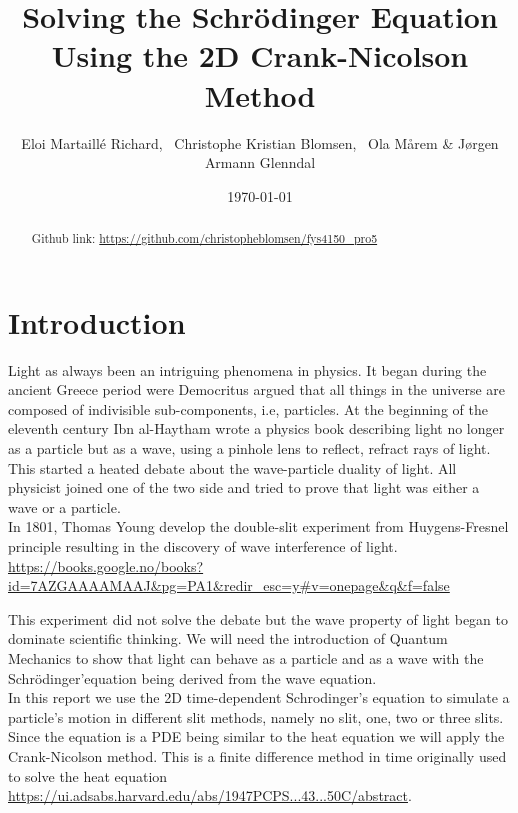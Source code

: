 \documentclass[english,notitlepage,reprint,nofootinbib]{revtex4-2}  %
\begin{document}
	
	\title{Solving the Schrödinger Equation Using the 2D Crank-Nicolson Method}  %
	\author{Eloi Martaillé Richard,
	\
	Christophe Kristian Blomsen,
	\
	Ola Mårem
	\&
	Jørgen Armann Glenndal
    }
	\date{\today}                             %
	\noaffiliation                            %
	
	\begin{abstract}
Github link: \href{https://github.com/christopheblomsen/fys4150_pro5}{https://github.com/christopheblomsen/fys4150\_pro5}
\end{abstract}
	\maketitle	
	
	
	\section{Introduction} \label{sec:introduction}

	Light as always been an intriguing phenomena in physics. It began during the ancient Greece
	period were Democritus argued that all things in the universe are composed of indivisible 
	sub-components, i.e, particles. At the beginning of the eleventh century Ibn al-Haytham 
	wrote a physics book describing light no longer as a particle but as a wave, using a 
	pinhole lens to reflect, refract rays of light. This started a heated debate about the 
	wave-particle duality of light. All physicist joined one of the two side and tried to 
	prove that light was either a wave or a particle. \\
	
	In 1801, Thomas Young develop the double-slit experiment from Huygens-Fresnel principle
	resulting in the discovery of wave interference of light. \url{https://books.google.no/books?id=7AZGAAAAMAAJ&pg=PA1&redir_esc=y#v=onepage&q&f=false}
	
	This experiment did not solve the debate but the wave property of light began to dominate 
	scientific thinking. We will need the introduction of Quantum Mechanics to show that 
	light can behave as a particle and as a wave with the Schrödinger'equation being derived 
	from the wave equation. \\
	
	In this report we use the 2D time-dependent Schrodinger's equation to simulate a particle's
	motion in different slit methods, namely no slit, one, two or three slits. Since the 
	equation is a PDE being similar to the heat equation we will apply the Crank-Nicolson method.
	This is a finite difference method in time originally used to solve the heat equation
	\url{https://ui.adsabs.harvard.edu/abs/1947PCPS...43...50C/abstract}. \\
	
\end{document}
